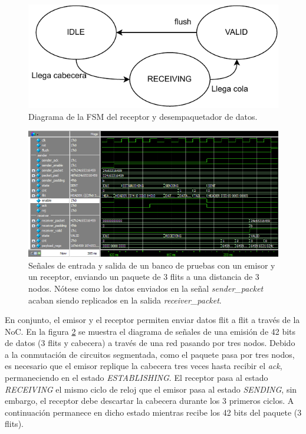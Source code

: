 \begin{figure}[h]
    \centering
    \includegraphics{images/diagrams/receiver_fsm.drawio.pdf}
    \caption[Diagrama de la Máquina de Estados del receptor y desempaquetador de datos]{Diagrama de la FSM del receptor y desempaquetador de datos.}
    \label{fig:receiver_fsm}
\end{figure}
\begin{figure}[ht]
    \centering
    \includegraphics[width=\linewidth]{images/signals/signals_receiver_sender.png}
    \caption[Señales de entrada y salida receptor y emisor en serie]{Señales de entrada y salida de un banco de pruebas con un emisor y un receptor, enviando un paquete de 3 flits a una distancia de 3 nodos. Nótese como los datos enviados en la señal \textit{sender\_packet} acaban siendo replicados en la salida \textit{receiver\_packet}.}
    \label{fig:signals_receiver_senders}
\end{figure}

En conjunto, el emisor y el receptor permiten enviar datos flit a flit a través de la NoC. En la figura \ref{fig:signals_receiver_senders} se muestra el diagrama de señales de una emisión de 42 bits de datos (3 flits y cabecera) a través de una red pasando por tres nodos. Debido a la conmutación de circuitos segmentada, como el paquete pasa por tres nodos, es necesario que el emisor replique la cabecera tres veces hasta recibir el \textit{ack}, permaneciendo en el estado \textit{ESTABLISHING}. El receptor pasa al estado \textit{RECEIVING} el mismo ciclo de reloj que el emisor pasa al estado \textit{SENDING}, sin embargo, el receptor debe descartar la cabecera durante los 3 primeros ciclos. A continuación permanece en dicho estado mientras recibe los 42 bits del paquete (3 flits). 


